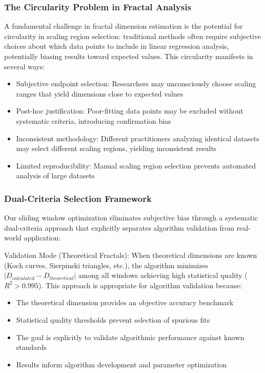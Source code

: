 \documentclass[preprint,12pt]{elsarticle}
\def\textbf#1{#1}%
\begin{document}
\subsubsection{The Circularity Problem in Fractal Analysis}

A fundamental challenge in fractal dimension estimation is the potential for circularity in scaling region selection: traditional methods often require subjective choices about which data points to include in linear regression analysis, potentially biasing results toward expected values. This circularity manifests in several ways:

\begin{itemize}
\item \textbf{Subjective endpoint selection}: Researchers may unconsciously choose scaling ranges that yield dimensions close to expected values
\item \textbf{Post-hoc justification}: Poor-fitting data points may be excluded without systematic criteria, introducing confirmation bias
\item \textbf{Inconsistent methodology}: Different practitioners analyzing identical datasets may select different scaling regions, yielding inconsistent results
\item \textbf{Limited reproducibility}: Manual scaling region selection prevents automated analysis of large datasets
\end{itemize}

\subsubsection{Dual-Criteria Selection Framework}

Our sliding window optimization eliminates subjective bias through a systematic dual-criteria approach that explicitly separates algorithm validation from real-world application:

\textbf{Validation Mode (Theoretical Fractals)}:
When theoretical dimensions are known (Koch curves, Sierpinski triangles, etc.), the algorithm minimizes $|D_{calculated} - D_{theoretical}|$ among all windows achieving high statistical quality ($R^2 > 0.995$). This approach is appropriate for algorithm validation because:
\begin{itemize}
\item The theoretical dimension provides an objective accuracy benchmark
\item Statistical quality thresholds prevent selection of spurious fits
\item The goal is explicitly to validate algorithmic performance against known standards
\item Results inform algorithm development and parameter optimization
\end{itemize}
\end{document}
